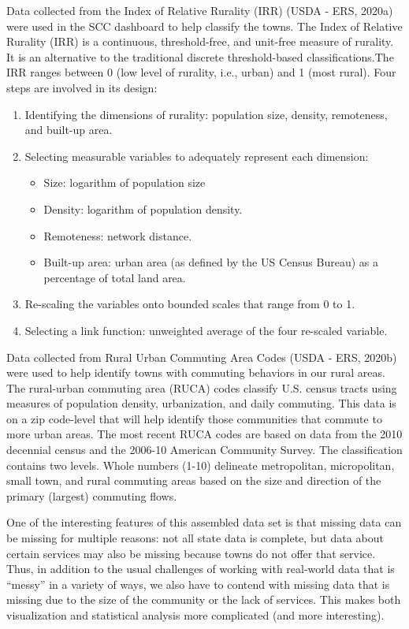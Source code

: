 \documentclass[print]{nuthesis}
\begin{document}
Data collected from the Index of Relative Rurality (IRR) (USDA - ERS, 2020a) were used in the SCC dashboard to help classify the towns. The Index of Relative Rurality (IRR) is a continuous, threshold-free, and unit-free measure of rurality. It is an alternative to the traditional discrete threshold-based classifications.The IRR ranges between 0 (low level of rurality, i.e., urban) and 1 (most rural). Four steps are involved in its design:

\begin{enumerate}
\item Identifying the dimensions of rurality: population size, density, remoteness, and built-up area.
\item Selecting measurable variables to adequately represent each dimension:
    \begin{itemize}
        \item Size: logarithm of population size
        \item Density: logarithm of population density.
        \item Remoteness: network distance.
        \item Built-up area: urban area (as defined by the US Census Bureau) as a percentage of total land area.
    \end{itemize}
\item Re-scaling the variables onto bounded scales that range from 0 to 1.
\item Selecting a link function: unweighted average of the four re-scaled variable.
\end{enumerate}

Data collected from Rural Urban Commuting Area Codes (USDA - ERS, 2020b) were used to help identify towns with commuting behaviors in our rural areas. The rural-urban commuting area (RUCA) codes classify U.S. census tracts using measures of population density, urbanization, and daily commuting. This data is on a zip code-level that will help identify those communities that commute to more urban areas. The most recent RUCA codes are based on data from the 2010 decennial census and the 2006-10 American Community Survey. The classification contains two levels. Whole numbers (1-10) delineate metropolitan, micropolitan, small town, and rural commuting areas based on the size and direction of the primary (largest) commuting flows.

One of the interesting features of this assembled data set is that missing data can be missing for multiple reasons: not all state data is complete, but data about certain services may also be missing because towns do not offer that service.
Thus, in addition to the usual challenges of working with real-world data that is ``messy'' in a variety of ways, we also have to contend with missing data that is missing due to the size of the community or the lack of services. This makes both visualization and statistical analysis more complicated (and more interesting).
\end{document}
